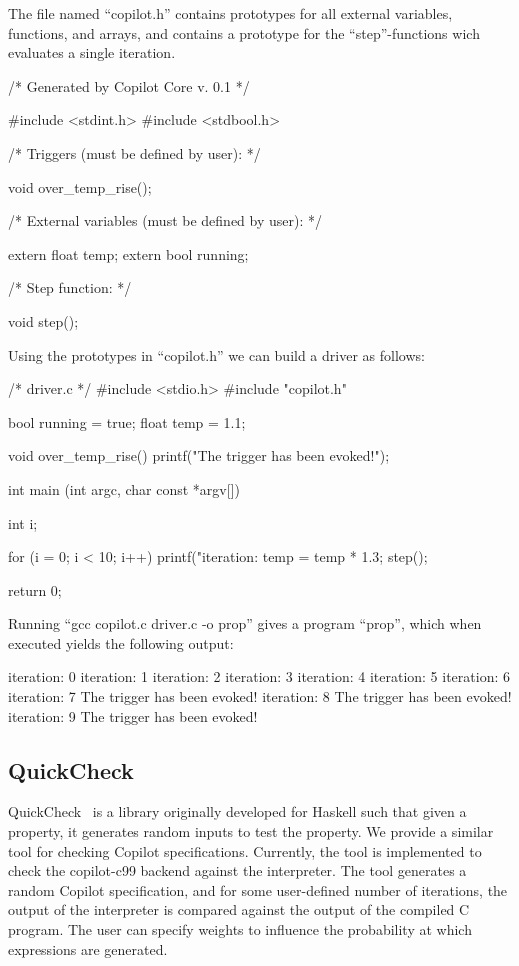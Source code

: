 \documentclass[]{article}
\theoremstyle{example}
\begin{document}
The file named ``copilot.h'' contains prototypes for all external variables, functions, and arrays,
and contains a prototype for the ``step''-functions wich evaluates a single iteration.

\begin{code}
/* Generated by Copilot Core v. 0.1 */

#include <stdint.h>
#include <stdbool.h>

/* Triggers (must be defined by user): */

void over_temp_rise();

/* External variables (must be defined by user): */

extern float temp;
extern bool running;

/* Step function: */

void step();
\end{code}

Using the prototypes in ``copilot.h'' we can build a driver as follows:

\begin{code}
/* driver.c */
#include <stdio.h>
#include "copilot.h"

bool running = true;
float temp = 1.1;

void over_temp_rise()
{
  printf("The trigger has been evoked!\n");
}

int main (int argc, char const *argv[])
{
  int i;

  for (i = 0; i < 10; i++)
  {
    printf("iteration: %
    temp = temp * 1.3;
    step();
  }

  return 0;
}
\end{code}

Running ``gcc copilot.c driver.c -o prop'' gives a program ``prop'', which when executed
yields the following output:
%
\begin{code}
iteration: 0
iteration: 1
iteration: 2
iteration: 3
iteration: 4
iteration: 5
iteration: 6
iteration: 7
The trigger has been evoked!
iteration: 8
The trigger has been evoked!
iteration: 9
The trigger has been evoked!
\end{code}
%

\subsection{QuickCheck}
QuickCheck~\cite{qc} is a library originally developed for Haskell such that
given a property, it generates random inputs to test the property.  We provide a
similar tool for checking Copilot specifications.  Currently, the tool is
implemented to check the copilot-c99 backend against the interpreter.  The tool
generates a random Copilot specification, and for some user-defined number of
iterations, the output of the interpreter is compared against the output of the
compiled C program.  The user can specify weights to influence the probability
at which expressions are generated.
\end{document}
